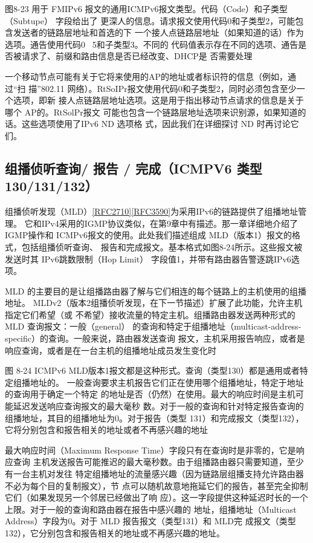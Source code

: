 图8-23 用于 FMIPv6 报文的通用ICMPv6报文类型。代码（Code）和子类型（Subtupe） 字段给出了
更深人的信息。请求报文使用代码0和子类型2，可能包含发送者的链路层地址和首选的下
一个接人点链路层地址（如果知道的话）作为选项。通告使用代码0~ 5和子类型3。不同的
代码值表示存在不同的选项、通告是否被请求了、前缀和路由信息是否已经改变、DHCP是
否需要处理

一个移动节点可能有关于它将来使用的AP的地址或者标识符的信息（例如，通过“扫
描”802.11 网络）。RtSoIPr报文使用代码0和子类型2，同时必须包含至少一个选项，即新
接人点链路层地址选项。这是用于指出移动节点请求的信息是关于哪个 AP的。RtSolPr报文
可能也包含一个链路层地址选项来识别源，如果知道的话。这些选项使用了IPv6 ND 选项格
式，因此我们在详细探讨 ND 时再讨论它们。

\subsection{组播侦听查询/ 报告 / 完成（ICMPV6 类型 130/131/132）}
组播侦听发现（MLD）\href{https://www.rfc-editor.org/rfc/rfc2710}{[RFC2710]}\href{https://www.rfc-editor.org/rfc/rfc3590}{[RFC3590]}为采用IPv6的链路提供了组播地址管理。
它和IPv4采用的IGMP协议类似，在第9章中有描述。那一章详细地介绍了IGMP操作和
ICMPv6报文的使用。此处我们描述组成 MLD（版本1）报文的格式，包括组播侦听查询、
报告和完成报文。基本格式如图8-24所示。这些报文被发送时其 IPv6跳数限制（Hop Limit）
字段值1，并带有路由器告警逐跳IPv6选项。

MLD 的主要目的是让组播路由器了解与它们相连的每个链路上的主机使用的组播地址。
MLDv2（版本2组播侦听发现，在下一节描述）扩展了此功能，允许主机指定它们希望（或
不希望）接收流量的特定主机。组播路由器发送两种形式的 MLD 查询报文：一般（general）
的查询和特定于组播地址（multicast-address-specific）的查询。一般来说，路由器发送查询
报文，主机采用报告响应，或者是响应查询，或者是在一台主机的组播地址成员发生变化时

图 8-24 ICMPv6 MLD版本1报文都是这种形式。查询（类型130）都是通用或者特定组播地址的。
一般查询要求主机报告它们正在使用哪个组播地址，特定于地址的查询用于确定一个特定
的地址是否（仍然）在使用。最大的响应时间是主机可能延迟发送响应查询报文的最大毫秒
数。对于一般的查询和针对特定报告查询的组播地址，其目的组播地址为0。对于报告（类型
131）和完成报文（类型132），它将分别包含和报告相关的地址或者不再感兴趣的地址

最大响应时间（Maximum Response Time）字段只有在查询时是非零的，它是响应查询
主机发送报告可能推迟的最大毫秒数。由于组播路由器只需要知道，至少有一台主机对发往
特定组播地址的流量感兴趣（因为链路层组播支持允许路由器不必为每个目的复制报文），节
点可以随机故意地拖延它们的报告，甚至完全抑制它们（如果发现另一个邻居已经做出了响
应）。这一字段提供这种延迟时长的一个上限。对于一般的查询和路由器在报告中感兴趣的
地址，组播地址（Multicast Address）字段为0。对于 MLD 报告报文（类型131）和 MLD完
成报文（类型132），它分别包含和报告相关的地址或不再感兴趣的地址。

